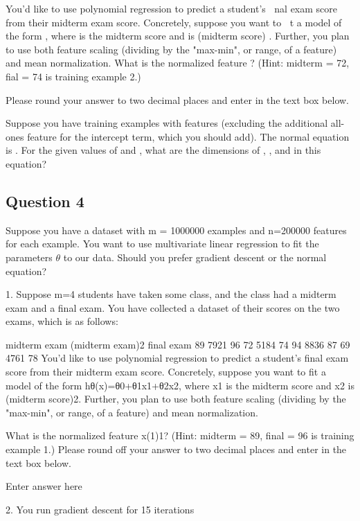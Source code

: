 You'd like to use polynomial regression to predict a student's ჌▘nal exam score
from their midterm exam score. Concretely, suppose you want to ჌▘t a model
of the form , where is the midterm score and
is (midterm score) . Further, you plan to use both feature scaling (dividing
by the "max-min", or range, of a feature) and mean normalization.
What is the normalized feature ? (Hint: midterm = 72, fial = 74 is training
example 2.) 


Please round your answer to two decimal places and enter in
the text box below.


Suppose you have training examples with features (excluding
the additional all-ones feature for the intercept term, which you should add).
The normal equation is . For the given values of and
, what are the dimensions of , , and in this equation?

\subsection{Question 4}
Suppose you have a dataset with m = 1000000 examples and n=200000
features for each example. You want to use multivariate linear regression to
fit the parameters $\theta$ to our data. Should you prefer gradient descent or the
normal equation?



1. 
Suppose m=4 students have taken some class, and the class had a midterm exam and a final exam. You have collected a dataset of their scores on the two exams, which is as follows:

midterm exam	(midterm exam)2	final exam
89	7921	96
72	5184	74
94	8836	87
69	4761	78
You'd like to use polynomial regression to predict a student's final exam score from their midterm exam score. Concretely, suppose you want to fit a model of the form hθ(x)=θ0+θ1x1+θ2x2, where x1 is the midterm score and x2 is (midterm score)2. Further, you plan to use both feature scaling (dividing by the "max-min", or range, of a feature) and mean normalization.

What is the normalized feature x(1)1? (Hint: midterm = 89, final = 96 is training example 1.) Please round off your answer to two decimal places and enter in the text box below.

Enter answer here

2. 
You run gradient descent for 15 iterations

